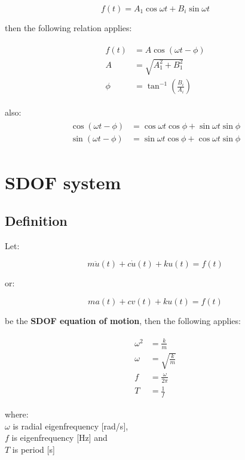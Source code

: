 \documentclass[10pt,b5paper,titlepage]{book}
\newenvironment{eqarray}
{
    \begin{eqnarray}
        \begin{aligned}
}
{
        \end{aligned}
    \end{eqnarray}
}
\begin{document}
\begin{equation}
    f(t) = A_1 \cos{\omega t} + B_i \sin{\omega t}
\end{equation}

then the following relation applies:

\begin{eqarray}
    f(t) &= A \cos{\left( \omega t - \phi \right)}\\
    A &= \sqrt{A_1^2 + B_1^2}\\
    \phi &= \tan^{-1} \left( \frac{B_i}{A_i} \right)
\end{eqarray}

also:
\begin{eqarray}
    \cos{\left( \omega t - \phi \right)} &=
    \cos{\omega t} \cos{\phi} + \sin{\omega t} \sin{\phi}\\
    \sin{\left( \omega t - \phi \right)} &=
    \sin{\omega t} \cos{\phi} + \cos{\omega t} \sin{\phi}
\end{eqarray}



\section{SDOF system}

\subsection{Definition}

Let:

\begin{equation}
    m \ddot{u}(t) + c \dot{u}(t) + k u(t) = f(t)
\end{equation}

or:

\begin{equation}
    m a(t) + c v(t) + k u(t) = f(t)
\end{equation}

be the \textbf{SDOF equation of motion}, then the following applies:

\begin{eqarray}
    \omega^2 &= \frac{k}{m} \\
    \omega &= \sqrt{\frac{k}{m}} \\
    f &= \frac{\omega}{2 \pi} \\
    T &= \frac{1}{f}
\end{eqarray}

where:\\
$ \omega $ is radial eigenfrequency [rad/s],\\
$ f $ is eigenfrequency [Hz] and\\
$ T $ is period [s]
\end{document}
